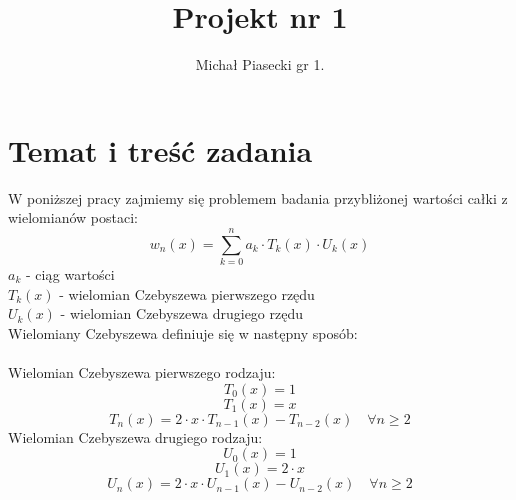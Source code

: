 \documentclass{article}\usepackage{amsmath,amsfonts,amssymb}
\title{Projekt nr 1 \\}
\author{Michał Piasecki gr 1. }
\begin{document}
\maketitle

\section{Temat i treść zadania}
W poniższej pracy zajmiemy się problemem badania przybliżonej wartości całki z wielomianów postaci: \[ w_{n}(x) = \sum_{k = 0}^{n} a_{k}  \cdot T_{k}(x)  \cdot U_{k}(x) \] 
\boldmath
$a_{k}$ - ciąg wartości \\
$T_{k}(x)$ - wielomian Czebyszewa pierwszego rzędu \\
$U_{k}(x)$ - wielomian Czebyszewa drugiego rzędu \\
\unboldmath
Wielomiany Czebyszewa definiuje się w następny sposób: \\
\\
Wielomian Czebyszewa pierwszego rodzaju:
\[ T_{0}(x) = 1 \] 
\[ T_{1}(x) = x \] 
\[ T_{n}(x) = 2 \cdot x \cdot T_{n - 1}(x) - T_{n - 2}(x) \quad  \forall  n \geq 2 \] 
Wielomian Czebyszewa drugiego rodzaju:
\[ U_{0}(x) = 1 \] 
\[ U_{1}(x) = 2 \cdot x \] 
\[ U_{n}(x) = 2 \cdot x \cdot U_{n - 1}(x) - U_{n - 2}(x) \quad  \forall  n \geq 2 \] 


\newpage
\end{document}
